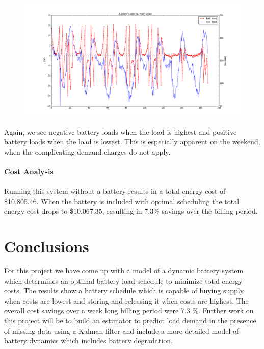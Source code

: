 \documentclass[12pt]{article}
\begin{document}
\begin{figure}[H]
\includegraphics[width=\textwidth]{batVsys}
\end{figure}
Again, we see negative battery loads when the load is highest and positive battery loads when the load is lowest. This is especially apparent on the weekend, when the complicating demand charges do not apply.

\paragraph{Cost Analysis}
Running this system without a battery results in a total energy cost of \$10,805.46. When the battery is included with optimal scheduling the total energy cost drops to \$10,067.35, resulting in 7.3\% savings over the billing period.

\section{Conclusions}\label{conclusions}
For this project we have come up with a model of a dynamic battery system which determines an optimal battery load schedule to minimize total energy costs. The results show a battery schedule which is capable of buying supply when costs are lowest and storing and releasing it when costs are highest. The overall cost savings over a week long billing period were 7.3 \%. Further work on this project will be to build an estimator to predict load demand in the presence of missing data using a Kalman filter and include a more detailed model of battery dynamics which includes battery degradation. 



\end{document}
